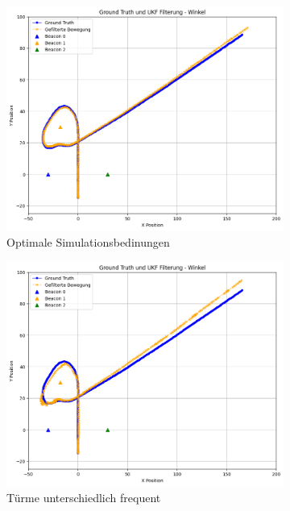 \begin{figure}
    \begin{subfigure}{.333\textwidth}
        \centering
        \includegraphics[width=.9\linewidth]{Ergebnisse/plots_fahrten/winkel/winkel_dyn_acc_basic.png}  
        \caption{Optimale Simulationsbedinungen}
    \end{subfigure}    
    \begin{subfigure}{.333\textwidth}
        \centering
        \includegraphics[width=.9\linewidth]{Ergebnisse/plots_fahrten/winkel/winkel_dyn_acc_freq.png} 
        \caption{Türme unterschiedlich frequent}
    \end{subfigure}    
    \begin{subfigure}{.333\textwidth}
        \centering

\end{subfigure}
\end{figure}

